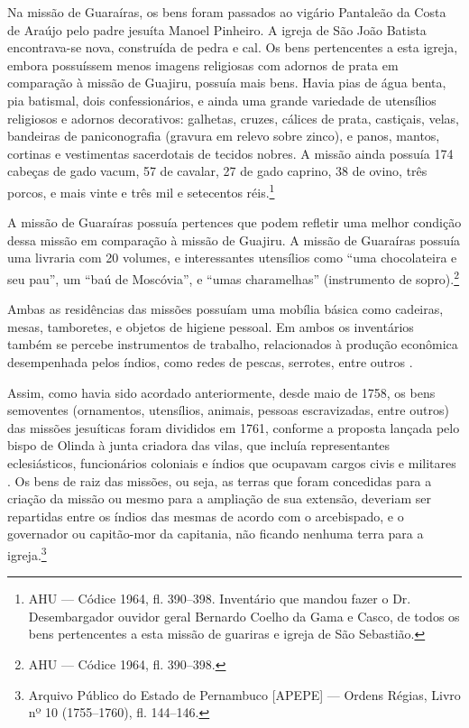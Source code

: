 \begin{refsection}
Na missão de Guaraíras, os bens foram passados ao vigário Pantaleão da Costa de Araújo pelo padre jesuíta Manoel Pinheiro. A igreja de São João Batista encontrava-se nova, construída de pedra e cal. Os bens pertencentes a esta igreja, embora possuíssem menos imagens religiosas com adornos de prata em comparação à missão de Guajiru, possuía mais bens. Havia pias de água benta, pia batismal, dois confessionários, e ainda uma grande variedade de utensílios religiosos e adornos decorativos: galhetas, cruzes, cálices de prata, castiçais, velas, bandeiras de paniconografia (gravura em relevo sobre zinco), e panos, mantos, cortinas e vestimentas sacerdotais de tecidos nobres. A missão ainda possuía 174 cabeças de gado vacum, 57 de cavalar, 27 de gado caprino, 38 de ovino, três porcos, e mais vinte e três mil e setecentos réis.\footnote{AHU --- Códice 1964, fl. 390--398. Inventário que mandou fazer o Dr. Desembargador ouvidor geral Bernardo Coelho da Gama e Casco, de todos os bens pertencentes a esta missão de guariras e igreja de São Sebastião.}  

A missão de Guaraíras possuía pertences que podem refletir uma melhor condição dessa missão em comparação à missão de Guajiru. A missão de Guaraíras possuía uma livraria com 20 volumes, e interessantes utensílios como “uma chocolateira e seu pau”, um “baú de Moscóvia”, e “umas charamelhas” (instrumento de sopro).\footnote{AHU --- Códice 1964, fl. 390--398.} 

Ambas as residências das missões possuíam uma mobília básica como cadeiras, mesas, tamboretes, e objetos de higiene pessoal. Em ambos os inventários também se percebe instrumentos de trabalho, relacionados à produção econômica desempenhada pelos índios, como redes de pescas, serrotes, entre outros \cite[p.~173]{Lopes2005}. 

Assim, como havia sido acordado anteriormente, desde maio de 1758, os bens semoventes (ornamentos, utensílios, animais, pessoas escravizadas, entre outros) das missões jesuíticas foram divididos em 1761, conforme a proposta lançada pelo bispo de Olinda à junta criadora das vilas, que incluía representantes eclesiásticos, funcionários coloniais e índios que ocupavam cargos civis e militares \cite[p.~179]{Lopes2005}. Os bens de raiz das missões, ou seja, as terras que foram concedidas para a criação da missão ou mesmo para a ampliação de sua extensão, deveriam ser repartidas entre os índios das mesmas de acordo com o arcebispado, e o governador ou capitão-mor da capitania, não ficando nenhuma terra para a igreja.\footnote{Arquivo Público do Estado de Pernambuco [APEPE] --- Ordens Régias, Livro nº 10 (1755--1760), fl. 144--146. }


\end{refsection}
